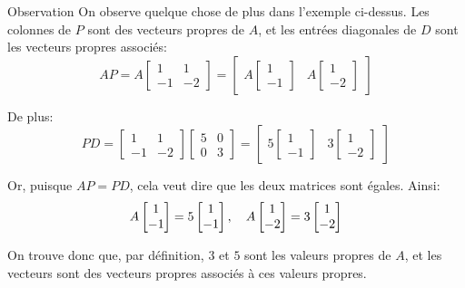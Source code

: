 \documentclass[a4paper]{article}
\begin{document}
\begin{parag}{Observation}
    On observe quelque chose de plus dans l'exemple ci-dessus. Les colonnes de $P$ sont des vecteurs propres de $A$, et les entrées diagonales de $D$ sont les vecteurs propres associés: 
    \[AP = A\begin{bmatrix} 1 & 1 \\ -1 & -2 \end{bmatrix} = \begin{bmatrix} A \begin{bmatrix} 1 \\ -1 \end{bmatrix} & A \begin{bmatrix} 1 \\ -2 \end{bmatrix} \end{bmatrix} \]
    
    De plus: 
    \[PD = \begin{bmatrix} 1 & 1 \\ -1 & -2 \end{bmatrix} \begin{bmatrix} 5 & 0 \\ 0 & 3 \end{bmatrix} = \begin{bmatrix} 5 \begin{bmatrix} 1 \\ -1 \end{bmatrix} & 3 \begin{bmatrix} 1 \\ -2 \end{bmatrix}  \end{bmatrix} \]

    Or, puisque $AP = PD$, cela veut dire que les deux matrices sont égales. Ainsi: 
    \[A \begin{bmatrix} 1 \\ -1 \end{bmatrix} = 5\begin{bmatrix} 1 \\ -1 \end{bmatrix}, \quad A \begin{bmatrix} 1 \\ -2 \end{bmatrix} = 3\begin{bmatrix} 1 \\ -2 \end{bmatrix} \]
    
    On trouve donc que, par définition, $3$ et $5$ sont les valeurs propres de $A$, et les vecteurs sont des vecteurs propres associés à ces valeurs propres.
\end{parag}
\end{document}
